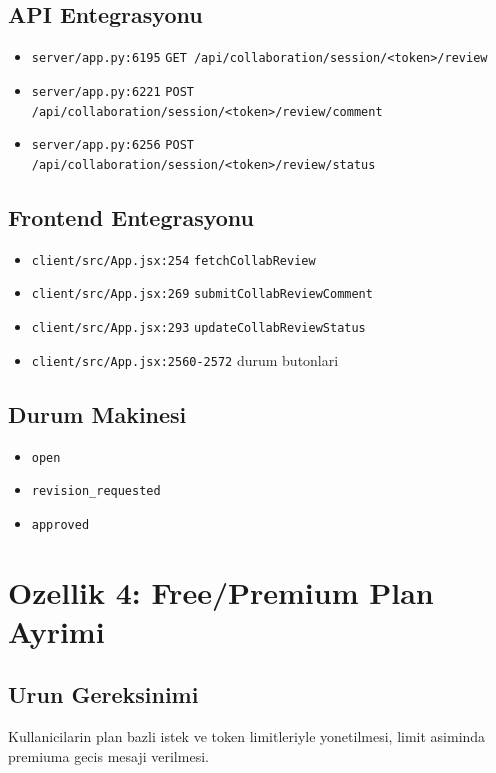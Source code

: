 \documentclass[12pt,a4paper]{article}
\begin{document}
\subsection{API Entegrasyonu}
\begin{itemize}[leftmargin=*]
  \item \texttt{server/app.py:6195} \texttt{GET /api/collaboration/session/<token>/review}
  \item \texttt{server/app.py:6221} \texttt{POST /api/collaboration/session/<token>/review/comment}
  \item \texttt{server/app.py:6256} \texttt{POST /api/collaboration/session/<token>/review/status}
\end{itemize}

\subsection{Frontend Entegrasyonu}
\begin{itemize}[leftmargin=*]
  \item \texttt{client/src/App.jsx:254} \texttt{fetchCollabReview}
  \item \texttt{client/src/App.jsx:269} \texttt{submitCollabReviewComment}
  \item \texttt{client/src/App.jsx:293} \texttt{updateCollabReviewStatus}
  \item \texttt{client/src/App.jsx:2560-2572} durum butonlari
\end{itemize}

\subsection{Durum Makinesi}
\begin{itemize}[leftmargin=*]
  \item \texttt{open}
  \item \texttt{revision\_requested}
  \item \texttt{approved}
\end{itemize}

\section{Ozellik 4: Free/Premium Plan Ayrimi}
\subsection{Urun Gereksinimi}
Kullanicilarin plan bazli istek ve token limitleriyle yonetilmesi,
limit asiminda premiuma gecis mesaji verilmesi.
\end{document}
